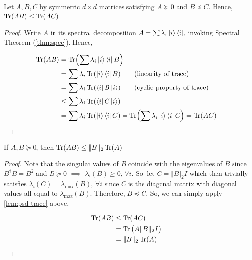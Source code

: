 \documentclass[main.tex]{subfiles}
\begin{document}
\begin{lemma}
\label{lem:psd-trace}
Let $A, B, C$ by symmetric $d \times d$ matrices satisfying $A \succeq 0$ and $B \preceq C$. Hence, $\Tr(AB) \leq \Tr(AC)$

\begin{proof}
	Write $A$ in its spectral decomposition $A = \sum \lambda_i \ket{i}\bra{i}$, invoking Spectral Theorem (\ref{thm:spec}). Hence,

	\begin{align*}
		\Tr(AB) &= \Tr(\sum \lambda_i \ket{i}\bra{i} B)\\
		&= \sum \lambda_i \Tr(\ket{i}\bra{i} B) \tag{linearity of trace}\\
		&= \sum \lambda_i \Tr(\bra{i} B \ket{i}) \tag{cyclic property of trace}\\
		&\leq \sum \lambda_i \Tr(\bra{i} C \ket{i})\\
		&= \sum \lambda_i \Tr(\ket{i}\bra{i} C) = \Tr(\sum \lambda_i \ket{i}\bra{i} C) = \Tr(AC)
	\end{align*}
\end{proof}
\end{lemma}

\begin{corollary}
\label{cor:psd-tr-norm-ineq}
If $A, B \succeq 0$, then $\Tr(AB) \leq \Vert B \Vert_2 \Tr(A)$

\begin{proof}
Note that the singular values of $B$ coincide with the eigenvalues of $B$ since $B^\dag B = B^2$ and $B \succeq 0$ $\implies$ $\lambda_i(B) \geq 0$, $\forall i$. So, let $C = \Vert B \Vert_2 I$ which then trivially satisfies $\lambda_i(C) = \lambda_{\max}(B)$, $\forall i$ since $C$ is the diagonal matrix with diagonal values all equal to $\lambda_{\max}(B)$. Therefore, $B \preceq C$. So, we can simply apply \ref{lem:psd-trace} above,

\begin{align*}
\Tr(AB) &\leq \Tr(AC) \\
&= \Tr\big(A \Vert B \Vert_2 I\big)\\
&= \Vert B \Vert_2 \Tr(A)
\end{align*}
\end{proof}
\end{corollary}
\end{document}
